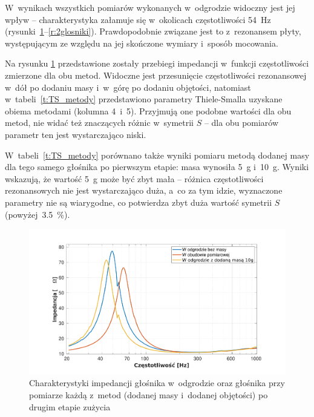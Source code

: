 \documentclass[12pt]{oska}
\begin{document}
	W~wynikach wszystkich pomiarów wykonanych w~odgrodzie widoczny jest jej wpływ -- charakterystyka załamuje się w~okolicach częstotliwości \SI{54}{\hertz} (rysunki~\ref{r:metody}--\ref{r:2glosniki}). Prawdopodobnie związane jest to z~rezonansem płyty, występującym ze względu na jej skończone wymiary i~sposób mocowania.
	
	Na rysunku \ref{r:metody} przedstawione zostały przebiegi impedancji w~funkcji częstotliwości zmierzone dla obu metod. Widoczne jest przesunięcie częstotliwości rezonansowej w~dół po dodaniu masy i~w~górę po dodaniu objętości, natomiast w~tabeli~\ref{t:TS_metody} przedstawiono parametry Thiele-Smalla uzyskane obiema metodami (kolumna 4~i~5). Przyjmują one podobne wartości dla obu metod, nie widać też znaczących różnic w~symetrii $S$ -- dla obu pomiarów parametr ten jest wystarczająco niski. 
	
    W~tabeli~\ref{t:TS_metody} porównano także wyniki pomiaru metodą dodanej masy dla tego samego głośnika po pierwszym etapie: masa wynosiła \SI{5}{\gram} i~\SI{10}{\gram}. Wyniki wskazują, że wartość \SI{5}{\gram} może być zbyt mała -- różnica częstotliwości rezonansowych nie jest wystarczająco duża, a~co za tym idzie, wyznaczone parametry nie są wiarygodne, co potwierdza zbyt duża wartość symetrii $S$ (powyżej~\SI{3,5}{\%}).
	
	\begin{figure}[!ht]
		\centering
		\includegraphics[width=.8\textwidth,trim={2cm .5cm 2cm 1cm},clip]{metody_2glosnik.pdf}
		\caption{Charakterystyki impedancji głośnika w~odgrodzie oraz głośnika przy pomiarze każdą z~metod (dodanej masy i~dodanej objętości) po drugim etapie zużycia}
		\label{r:metody}
	\end{figure}
	
\end{document}

